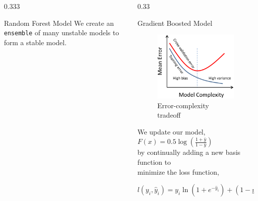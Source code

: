 \documentclass[final,size=a3]{beamer}
\newlength{\threecolwid}
\begin{document}
\begin{frame}[t]
\begin{columns}[t]
\begin{column}{\threecolwid}
\begin{columns}[t]
\begin{column}{0.333\threecolwid}
\begin{block}{Random Forest Model}
\vspace{-3mm}
We create an \texttt{ensemble} of many unstable models to form a stable model.

\end{block}

\end{column} %

\begin{column}{0.33\threecolwid}

\begin{block}{Gradient Boosted Model}

\begin{figure}[h]
\caption{Error-complexity tradeoff}
\includegraphics[scale=1.4]{images/error_complexity}
\end{figure}

%


We update our model, $F(x) = 0.5 \log \left(\frac{1 + \bar{y}}{1 - \bar{y}}\right)$ \\ by continually adding a new basis function to \\ minimize the loss function,

\vspace{-12mm}
\begin{equation*}
l(y_i, \hat{y}_i) = y_i \ln(1 + e^{-\hat{y}_i}) + (1 - y_i)\ln(1 + e^{\hat{y}_i})
\end{equation*}


\end{block}
\end{column}
\end{columns}
\end{column}
\end{columns}
\end{frame}
\end{document}
